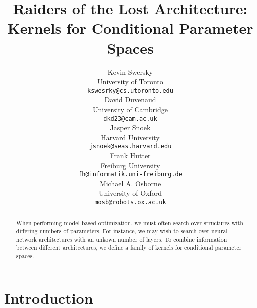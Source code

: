 \documentclass{article}
\begin{document}
\title{Raiders of the Lost Architecture:\\Kernels for Conditional Parameter Spaces}

\author{
Kevin Swersky \\
University of Toronto \\
\texttt{kswesrky@cs.utoronto.edu} \\
\And
David Duvenaud \\
University of Cambridge \\
\texttt{dkd23@cam.ac.uk} \\
\And
Jasper Snoek\\
Harvard University \\
\texttt{jsnoek@seas.harvard.edu} \\
\AND
Frank Hutter  \\
Freiburg University \\
{\tt fh@informatik.uni-freiburg.de} \\
\And
Michael A. Osborne \\
University of Oxford \\
{\tt mosb@robots.ox.ac.uk} \\
}




\maketitle
\begin{abstract}
When performing model-based optimization, we must often search over structures with differing numbers of parameters.  For instance, we may wish to search over neural network architectures with an unkown number of layers.  To combine information between different architectures, we define a family of kernels for conditional parameter spaces.
\end{abstract}


\section{Introduction}
\end{document}

